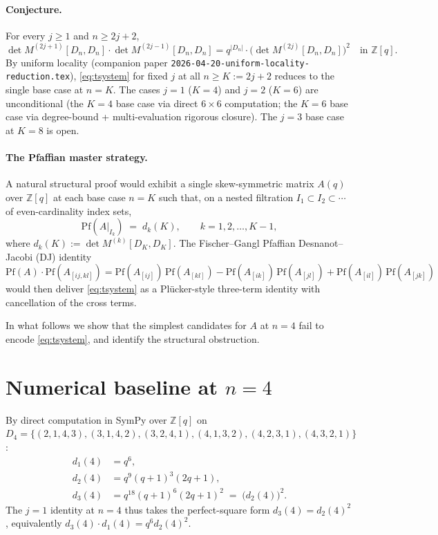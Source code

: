 \documentclass[11pt]{article}
\theoremstyle{definition}
\begin{document}
\paragraph{Conjecture.}
For every $j \geq 1$ and $n \geq 2j+2$,
\begin{equation}\label{eq:tsystem}
\det M^{(2j+1)}[D_n,D_n] \cdot \det M^{(2j-1)}[D_n,D_n]
= q^{|D_n|} \cdot \bigl(\det M^{(2j)}[D_n,D_n]\bigr)^2 \quad \text{in } \mathbb{Z}[q].
\end{equation}
By uniform locality (companion paper \texttt{2026-04-20-uniform-locality-reduction.tex}),
\eqref{eq:tsystem} for fixed $j$ at all $n \geq K := 2j+2$ reduces to the single
base case at $n=K$. The cases $j=1$ ($K=4$) and $j=2$ ($K=6$) are unconditional
(the $K=4$ base case via direct $6\times 6$ computation; the $K=6$ base case via
degree-bound + multi-evaluation rigorous closure). The $j=3$ base case at $K=8$
is open.

\paragraph{The Pfaffian master strategy.}
A natural structural proof would exhibit a single skew-symmetric matrix
$A(q)$ over $\mathbb{Z}[q]$ at each base case $n=K$ such that, on a nested
filtration $I_1 \subset I_2 \subset \cdots$ of even-cardinality index sets,
\[
\mathrm{Pf}(A|_{I_k}) \;=\; d_k(K), \qquad k = 1, 2, \ldots, K-1,
\]
where $d_k(K) := \det M^{(k)}[D_K,D_K]$. The Fischer--Gangl Pfaffian
Desnanot--Jacobi (DJ) identity
\begin{equation}\label{eq:pfdj}
\mathrm{Pf}(A) \cdot \mathrm{Pf}(A_{[ij,kl]})
= \mathrm{Pf}(A_{[ij]})\,\mathrm{Pf}(A_{[kl]})
- \mathrm{Pf}(A_{[ik]})\,\mathrm{Pf}(A_{[jl]})
+ \mathrm{Pf}(A_{[il]})\,\mathrm{Pf}(A_{[jk]})
\end{equation}
would then deliver \eqref{eq:tsystem} as a Pl\"ucker-style three-term identity
with cancellation of the cross terms.

In what follows we show that the simplest candidates for $A$ at $n=4$ fail to
encode \eqref{eq:tsystem}, and identify the structural obstruction.

\section{Numerical baseline at $n=4$}

By direct computation in SymPy over $\mathbb{Z}[q]$ on $D_4 = \{(2,1,4,3), (3,1,4,2),
(3,2,4,1), (4,1,3,2), (4,2,3,1), (4,3,2,1)\}$:
\begin{align*}
d_1(4) &= q^6, \\
d_2(4) &= q^9 (q+1)^3 (2q+1), \\
d_3(4) &= q^{18}(q+1)^6 (2q+1)^2 \;=\; \bigl(d_2(4)\bigr)^2.
\end{align*}
The $j=1$ identity at $n=4$ thus takes the perfect-square form
$d_3(4) = d_2(4)^2$, equivalently $d_3(4) \cdot d_1(4) = q^6 d_2(4)^2$.
\end{document}
